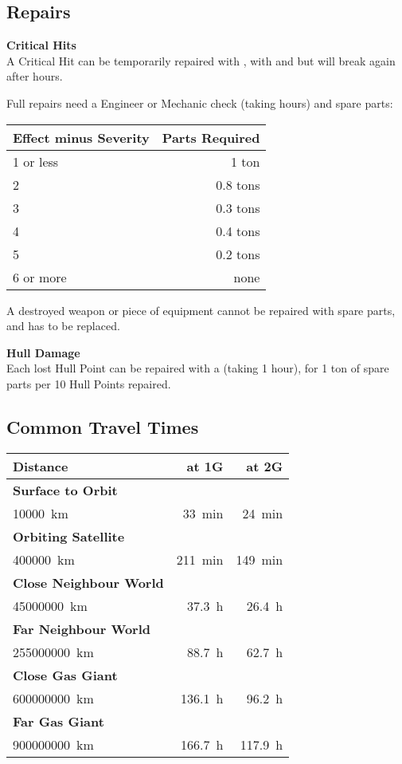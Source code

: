 \documentclass{cheatsheet}
\begin{document}
\begin{multicols}{3}
\subsection{Repairs}

\textbf{Critical Hits}\\
A Critical Hit can be temporarily repaired with , with  and
 but will break again after  hours.

Full repairs need a Engineer or Mechanic check (taking 
hours) and spare parts:

\begin{tabularx}{\linewidth}{Xr} \toprule
  Effect minus Severity & Parts Required \\ \midrule
  1 or less & 1 ton \\
  2 & 0.8 tons \\
  3 & 0.3 tons \\
  4 & 0.4 tons \\
  5 & 0.2 tons \\
  6 or more & none \\ \bottomrule
\end{tabularx}

A destroyed weapon or piece of equipment cannot be repaired with spare
parts, and has to be replaced.

\textbf{Hull Damage}\\
Each lost Hull Point can be repaired with a
 (taking 1
hour), for 1 ton of spare parts per 10 Hull Points repaired.

\subsection{Common Travel Times}

\begin{tabularx}{\linewidth}{Xrr} \toprule
  Distance & at 1G & at 2G \\ \midrule
  \textbf{Surface to Orbit} & & \\
  \SI{10000}{\kilo\meter} & \SI{33}{\minute} & \SI{24}{\minute} \\
  \textbf{Orbiting Satellite} & & \\
  \SI{400000}{\kilo\meter} & \SI{211}{\minute} & \SI{149}{\minute} \\
  \textbf{Close Neighbour World} & & \\
  \SI{45000000}{\kilo\meter} & \SI{37.3}{\hour} & \SI{26.4}{\hour} \\
  \textbf{Far Neighbour World} & & \\
  \SI{255000000}{\kilo\meter} & \SI{88.7}{\hour} & \SI{62.7}{\hour} \\
  \textbf{Close Gas Giant} & & \\
  \SI{600000000}{\kilo\meter} & \SI{136.1}{\hour} & \SI{96.2}{\hour} \\
  \textbf{Far Gas Giant} & & \\
  \SI{900000000}{\kilo\meter} & \SI{166.7}{\hour} & \SI{117.9}{\hour} \\ \bottomrule
\end{tabularx}


\end{multicols}
\end{document}
